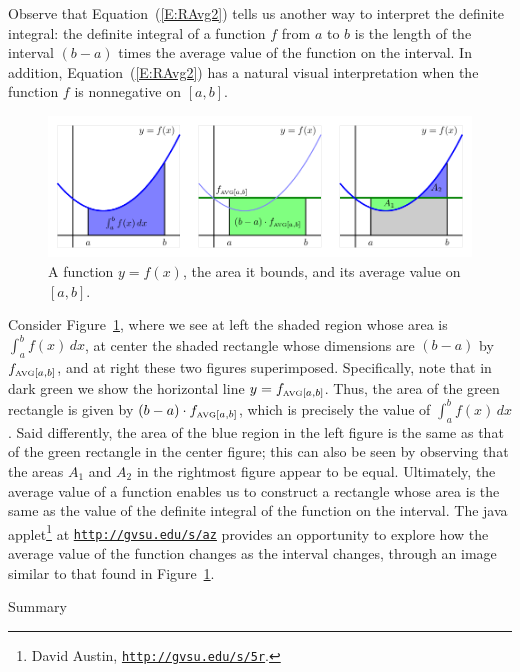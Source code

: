 Observe that Equation~(\ref{E:RAvg2}) tells us another way to interpret the definite integral:  the definite integral of a function $f$ from $a$ to $b$ is the length of the interval $(b-a)$ times the average value of the function on the interval.  In addition, Equation~(\ref{E:RAvg2}) has a natural visual interpretation when the function $f$ is nonnegative on $[a,b]$.  
\begin{figure}[h]
\begin{center}
\includegraphics{figures/4_3_AvgVal}
\caption{A function $y = f(x)$, the area it bounds, and its average value on $[a,b]$.} \label{F:4.3.AvgVal}
\end{center}
\end{figure}
Consider Figure~\ref{F:4.3.AvgVal}, where we see at left the shaded region whose area is $\int_a^b f(x) \, dx$, at center the shaded rectangle whose dimensions are $(b-a)$ by $f_{\mbox{\tiny{AVG}}[a,b]}$, and at right these two figures superimposed.  Specifically, note that in dark green we show the horizontal line $y = f_{\mbox{\tiny{AVG}}[a,b]}$.  Thus, the area of the green rectangle is given by $(b-a) \cdot f_{\mbox{\tiny{AVG}}[a,b]}$, which is precisely the value of $\int_a^b f(x) \, dx$.  Said differently, the area of the blue region in the left figure is the same as that of the green rectangle in the center figure; this can also be seen by observing that the areas $A_1$ and $A_2$ in the rightmost figure appear to be equal.  Ultimately, the average value of a function enables us to construct a rectangle whose area is the same as the value of the definite integral of the function on the interval.  The java applet\footnote{David Austin, \href{http://gvsu.edu/s/5r}{\texttt{http://gvsu.edu/s/5r}}.} at \href{http://gvsu.edu/s/az}{\texttt{http://gvsu.edu/s/az}} provides an opportunity to explore how the average value of the function changes as the interval changes, through an image similar to that found in Figure~\ref{F:4.3.AvgVal}.


Summary

